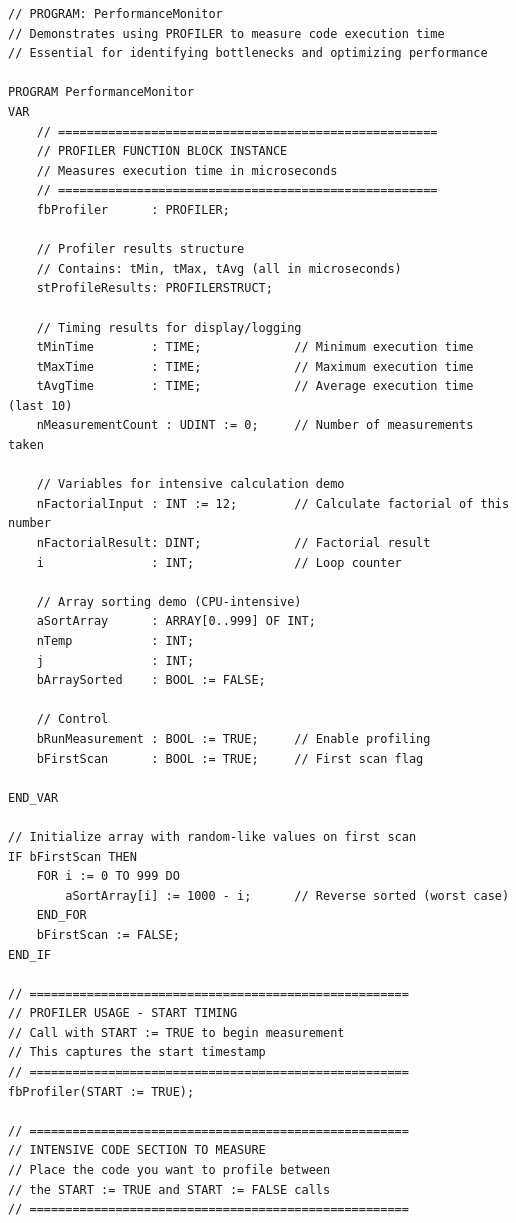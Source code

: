 \documentclass[11pt,a4paper]{article}
\begin{document}
\begin{lstlisting}
// PROGRAM: PerformanceMonitor
// Demonstrates using PROFILER to measure code execution time
// Essential for identifying bottlenecks and optimizing performance

PROGRAM PerformanceMonitor
VAR
    // =====================================================
    // PROFILER FUNCTION BLOCK INSTANCE
    // Measures execution time in microseconds
    // =====================================================
    fbProfiler      : PROFILER;
    
    // Profiler results structure
    // Contains: tMin, tMax, tAvg (all in microseconds)
    stProfileResults: PROFILERSTRUCT;
    
    // Timing results for display/logging
    tMinTime        : TIME;             // Minimum execution time
    tMaxTime        : TIME;             // Maximum execution time  
    tAvgTime        : TIME;             // Average execution time (last 10)
    nMeasurementCount : UDINT := 0;     // Number of measurements taken
    
    // Variables for intensive calculation demo
    nFactorialInput : INT := 12;        // Calculate factorial of this number
    nFactorialResult: DINT;             // Factorial result
    i               : INT;              // Loop counter
    
    // Array sorting demo (CPU-intensive)
    aSortArray      : ARRAY[0..999] OF INT;
    nTemp           : INT;
    j               : INT;
    bArraySorted    : BOOL := FALSE;
    
    // Control
    bRunMeasurement : BOOL := TRUE;     // Enable profiling
    bFirstScan      : BOOL := TRUE;     // First scan flag
    
END_VAR

// Initialize array with random-like values on first scan
IF bFirstScan THEN
    FOR i := 0 TO 999 DO
        aSortArray[i] := 1000 - i;      // Reverse sorted (worst case)
    END_FOR
    bFirstScan := FALSE;
END_IF

// =====================================================
// PROFILER USAGE - START TIMING
// Call with START := TRUE to begin measurement
// This captures the start timestamp
// =====================================================
fbProfiler(START := TRUE);

// =====================================================
// INTENSIVE CODE SECTION TO MEASURE
// Place the code you want to profile between
// the START := TRUE and START := FALSE calls
// =====================================================


\end{lstlisting}
\end{document}
